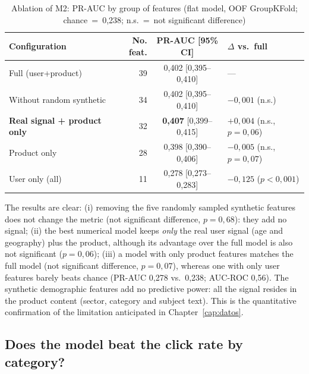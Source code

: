 \begin{table}[htbp]
\centering
\caption{Ablation of M2: PR-AUC by group of features (flat model, OOF GroupKFold; chance~=~0,238; n.s.~=~not significant difference)}
\label{tab:m2_ablation}
\begin{tabular}{lrcl}
\toprule
\textbf{Configuration} & \textbf{No. feat.} & \textbf{PR-AUC [95\% CI]} & \textbf{$\Delta$ vs.\ full} \\
\midrule
Full (user+product)              & 39 & 0,402 [0,395--0,410] & --- \\
Without random synthetic         & 34 & 0,402 [0,395--0,410] & $-0{,}001$ (n.s.) \\
\textbf{Real signal + product only} & 32 & \textbf{0,407} [0,399--0,415] & $+0{,}004$ (n.s., $p=0{,}06$) \\
Product only                     & 28 & 0,398 [0,390--0,406] & $-0{,}005$ (n.s., $p=0{,}07$) \\
User only (all)                  & 11 & 0,278 [0,273--0,283] & $-0{,}125$ ($p<0{,}001$) \\
\bottomrule
\end{tabular}
\end{table}

The results are clear: (i) removing the five randomly sampled synthetic features does not change the metric (not significant difference, $p=0{,}68$): they add no signal; (ii) the best numerical model keeps \emph{only} the real user signal (age and geography) plus the product, although its advantage over the full model is also not significant ($p=0{,}06$); (iii) a model with only product features matches the full model (not significant difference, $p=0{,}07$), whereas one with only user features barely beats chance (PR-AUC 0,278 vs.\ 0,238; AUC-ROC 0,56). The synthetic demographic features add no predictive power: all the signal resides in the product content (sector, category and subject text). This is the quantitative confirmation of the limitation anticipated in Chapter~\ref{cap:datos}.

\subsection{Does the model beat the click rate by category?}

